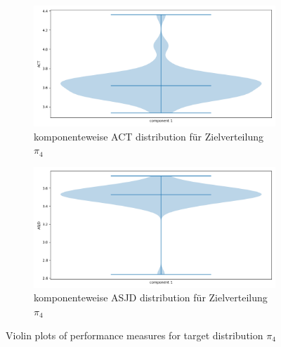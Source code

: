 \documentclass{scrartcl}
\begin{document}
    \begin{figure}
        \centering
        \begin{subfigure}{0.45\textheight}
              \centering
              \includegraphics[width=.8\linewidth]{../figs/ACT_pi_4.png}
              \caption{komponenteweise ACT distribution für Zielverteilung $\pi_4$}
              \label{violin_plots_pi_4_act}
        \end{subfigure}
        \begin{subfigure}{0.45\textheight}
              \centering
              \includegraphics[width=.8\linewidth]{../figs/ASJD_pi_4.png}
              \caption{komponenteweise ASJD distribution für Zielverteilung $\pi_4$}
              \label{violin_plots_pi_4_asjd}
        \end{subfigure}
        \caption{Violin plots of performance measures for target distribution $\pi_4$}
        \label{violin_plots_pi_4}
    \end{figure}
\end{document}

